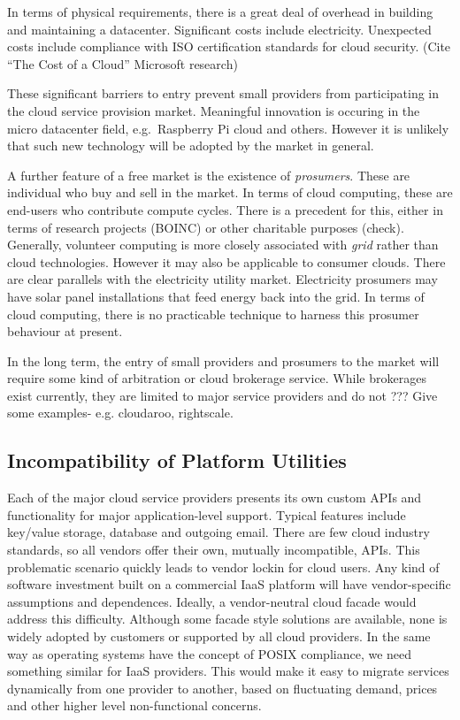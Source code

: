 \documentclass[conference,10pt]{IEEEtran}
\begin{document}
In terms of physical requirements, there is a great deal of overhead in building and maintaining a datacenter. Significant costs include electricity. Unexpected costs include compliance with ISO certification standards for cloud security. (Cite ``The Cost of a Cloud'' Microsoft research)

These significant barriers to entry prevent small providers from participating in the cloud service provision market. Meaningful innovation is occuring in the micro datacenter field, e.g.\ Raspberry Pi cloud and others.
However it is unlikely that such new technology will be adopted by the market in general.


A further feature of a free market is the existence of \emph{prosumers}. These are individual who buy and sell in the market. In terms of cloud computing, these are end-users who contribute compute cycles. There is a precedent for this, either in terms of research projects (BOINC) or other charitable purposes (check). Generally, volunteer computing is more closely associated with \emph{grid} rather than cloud technologies. However it may also be applicable to consumer clouds. There are clear parallels with the electricity utility market. Electricity prosumers may have solar panel installations that feed energy back into the grid. In terms of cloud computing, there is no practicable technique to harness this prosumer behaviour at present.

In the long term, the entry of small providers and prosumers to the market will require some kind of arbitration or cloud brokerage service. While brokerages exist currently, they are limited to major service providers and do not 
???
Give some examples- e.g. cloudaroo, rightscale.


\subsection{Incompatibility of Platform Utilities}

Each of the major cloud service providers presents its own custom APIs and functionality for major application-level support. Typical features include key/value storage, database and outgoing email.
There are few cloud industry standards, so all vendors offer their own, mutually incompatible, APIs.
This problematic scenario quickly leads to vendor lockin for cloud users. Any kind of software investment built on a commercial IaaS platform will have vendor-specific assumptions and dependences. 
Ideally, a vendor-neutral cloud facade would address this difficulty. Although some facade style solutions are available, none is widely adopted by customers or supported by all cloud providers.
In the same way as operating systems have the concept of POSIX compliance, we need something similar for IaaS providers. This would make it easy to migrate services dynamically from one provider to another, based on fluctuating demand, prices and other higher level non-functional concerns.
\end{document}
